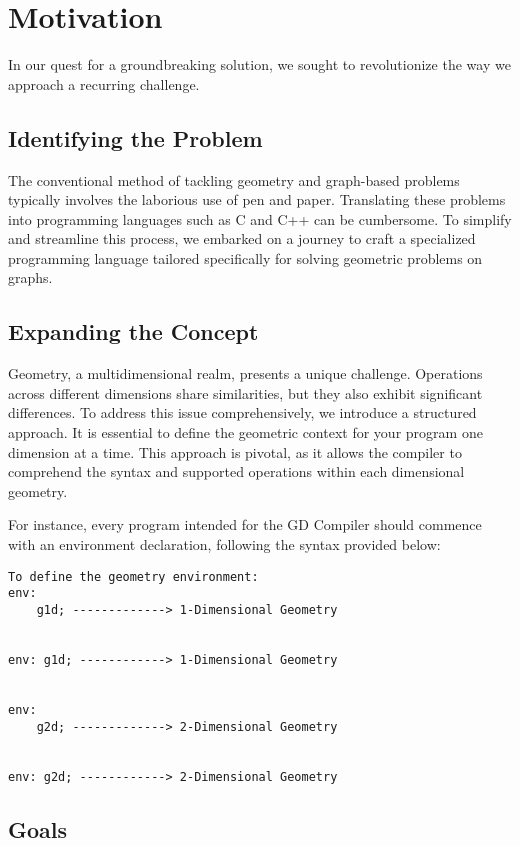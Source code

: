 \documentclass{article}
\begin{document}
\section{Motivation}

In our quest for a groundbreaking solution, we sought to revolutionize the way we approach a recurring challenge.

\subsection{Identifying the Problem}

The conventional method of tackling geometry and graph-based problems typically involves the laborious use of pen and paper. Translating these problems into programming languages such as C and C++ can be cumbersome. To simplify and streamline this process, we embarked on a journey to craft a specialized programming language tailored specifically for solving geometric problems on graphs.

\subsection{Expanding the Concept}

Geometry, a multidimensional realm, presents a unique challenge. Operations across different dimensions share similarities, but they also exhibit significant differences. To address this issue comprehensively, we introduce a structured approach. It is essential to define the geometric context for your program one dimension at a time. This approach is pivotal, as it allows the compiler to comprehend the syntax and supported operations within each dimensional geometry.

For instance, every program intended for the GD Compiler should commence with an environment declaration, following the syntax provided below:

\begin{verbatim}
To define the geometry environment:
env:
    g1d; -------------> 1-Dimensional Geometry
    
    
env: g1d; ------------> 1-Dimensional Geometry


env:
    g2d; -------------> 2-Dimensional Geometry
    
    
env: g2d; ------------> 2-Dimensional Geometry
\end{verbatim}

\subsection{Goals}
\end{document}
